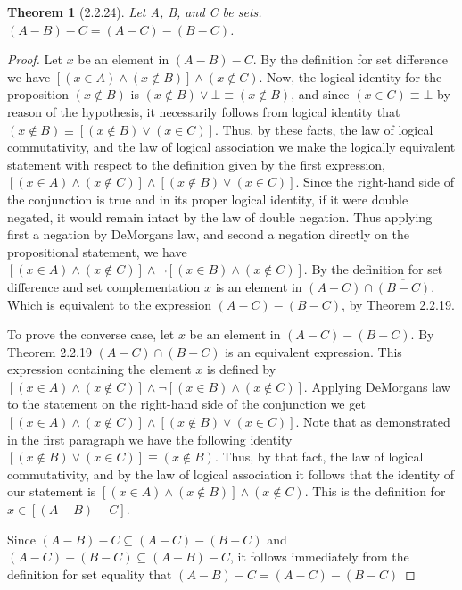 \documentclass[a4paper, 12pt]{article}
\theoremstyle{plain}
\newtheorem*{theorem*}{Theorem}
\begin{document}
	
	\begin{theorem*}[2.2.24]
		Let A, B, and C be sets. $(A - B) - C = (A - C) - (B - C)$.
	\end{theorem*}
	
	\begin{proof}
		Let $x$ be an element in $(A - B) - C$. By the definition for set difference we have 
		$[(x \in A) \land (x \notin B)] \land (x \notin C)$.  Now, the logical identity for the 
		proposition $(x \notin B)$ is $(x \notin B) \lor \bot \equiv (x \notin B)$, and since 
		\newline $(x \in C) \equiv \bot$ by reason of the hypothesis, it necessarily follows 
		from logical identity that $(x \notin B) \equiv [(x \notin B) \lor (x \in C)]$. Thus, 
		by these facts, the law of logical commutativity, and the law of logical association we 
		make the logically equivalent statement with respect to the definition given by the first 
		expression, $[(x \in A) \land (x \notin C)] \land [(x \notin B) \lor (x \in C)]$. Since 
		the right-hand side of the conjunction is true and in its proper logical identity, if it 
		were double negated, it would remain intact by the law of double negation. Thus applying 
		first a negation by DeMorgans law, and second a negation directly on the propositional 
		statement, we have 
		$[(x \in A) \land (x \notin C)] \land \lnot [(x \in B) \land (x \notin C)]$. By the 
		definition for set difference and set complementation $x$ is an element in 
		$(A - C) \cap \overline{(B - C)}$. Which is equivalent to the expression 
		$(A - C) - (B - C)$, by Theorem 2.2.19.
		
		To prove the converse case, let $x$ be an element in $(A - C) - (B - C)$. By Theorem 2.2.19  
		$(A - C) \cap \overline{(B - C)}$ is an equivalent expression. This expression containing 
		the element $x$ is defined by 
		\newline $[(x \in A) \land (x \notin C)] \land \lnot [(x \in B) \land (x \notin C)]$. 
		Applying DeMorgans law to the statement on the right-hand side of the conjunction we get 
		\newline $[(x \in A) \land (x \notin C)] \land [(x \notin B) \lor (x \in C)]$. Note that as 
		demonstrated in the first paragraph we have the following identity 
		$[(x \notin B) \lor (x \in C)] \equiv (x \notin B)$. Thus, by that fact, the law of logical 
		commutativity, and by the law of logical association it follows that the identity of our 
		statement is \newline $[(x \in A) \land (x \notin B)] \land (x \notin C)$. This is the 
		definition for $x \in [(A - B) - C]$.
		
		Since $(A - B) - C \subseteq (A - C) - (B - C)$ and 
		\newline $(A - C) - (B - C) \subseteq (A - B) - C$, it follows immediately from the 
		definition for set equality that $(A - B) - C = (A - C) - (B - C)$
	\end{proof}
\end{document}
